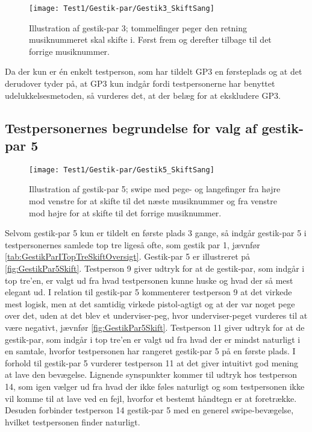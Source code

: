 %
\begin{figure}[H]
	\centering
	\texttt{[image: Test1/Gestik-par/Gestik3\_SkiftSang]}
	\caption{Illustration af gestik-par 3; tommelfinger peger den retning musiknummeret skal skifte i. Først frem og derefter tilbage til det forrige musiknummer.}
	\label{fig:GestikPar3Skift}
\end{figure}
\noindent
% 
Da der kun er én enkelt testperson, som har tildelt GP3 en førsteplads og at det derudover tyder på, at GP3 kun indgår fordi testpersonerne har benyttet udelukkelsesmetoden, så vurderes det, at der belæg for at ekskludere GP3.
%
\subsection{Testpersonernes begrundelse for valg af gestik-par 5}
\label{TestresultaterValgAfGestikkerBegrundelseGP5Skift}
%
%
\begin{figure}[H]
	\centering
	\texttt{[image: Test1/Gestik-par/Gestik5\_SkiftSang]}
	\caption{Illustration af gestik-par 5; swipe med pege- og langefinger fra højre mod venstre for at skifte til det næste musiknummer og fra venstre mod højre for at skifte til det forrige musiknummer.}
	\label{fig:GestikPar5Skift}
\end{figure}
\noindent
%
Selvom gestik-par 5 kun er tildelt en første plads 3 gange, så indgår gestik-par 5 i testpersonernes samlede top tre ligeså ofte, som gestik par 1, jævnfør \autoref{tab:GestikParITopTreSkiftOversigt}. Gestik-par 5 er illustreret på \autoref{fig:GestikPar5Skift}. Testperson 9 giver udtryk for at de gestik-par, som indgår i top tre'en, er valgt ud fra hvad testpersonen kunne huske og hvad der så mest elegant ud. I relation til gestik-par 5 kommenterer testperson 9 at det virkede mest logisk, men at det samtidig virkede pistol-agtigt og at der var noget pege over det, uden at det blev et underviser-peg, hvor underviser-peget vurderes til at være negativt, jævnfør \autoref{fig:GestikPar5Skift}. Testperson 11 giver udtryk for at de gestik-par, som indgår i top tre'en er valgt ud fra hvad der er mindst naturligt i en samtale, hvorfor testpersonen har rangeret gestik-par 5 på en første plads. I forhold til gestik-par 5 vurderer testperson 11 at det giver intuitivt god mening at lave den bevægelse. Lignende synspunkter kommer til udtryk hos testperson 14, som igen vælger ud fra hvad der ikke føles naturligt og som testpersonen ikke vil komme til at lave ved en fejl, hvorfor et bestemt håndtegn er at foretrække. Desuden forbinder testperson 14 gestik-par 5 med en generel swipe-bevægelse, hvilket testpersonen finder naturligt. 

